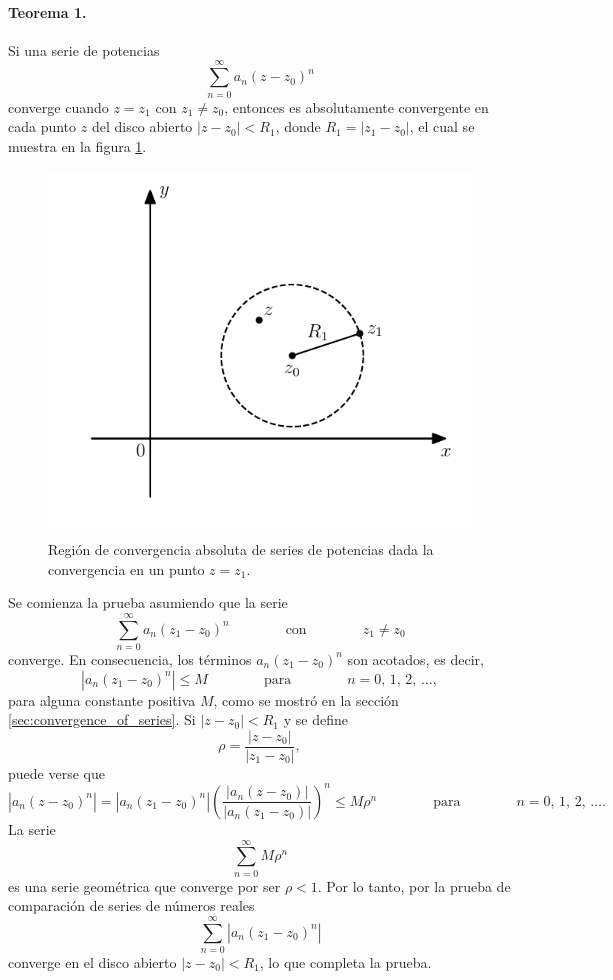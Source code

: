 \documentclass[a4paper]{report}
\begin{document}
\paragraph{Teorema 1.} Si una serie de potencias
\begin{equation}\label{eq:power_series_generic_definition_tmp1}
 \sum_{n=0}^\infty a_n(z-z_0)^n 
\end{equation}
converge cuando \(z=z_1\) con \(z_1\neq z_0\), entonces es absolutamente convergente en cada punto \(z\) del disco abierto \(|z-z_0|<R_1\), donde \(R_1=|z_1-z_0|\), el cual se muestra en la figura \ref{fig:series_absolute_convergence}.
\begin{figure}[!htb]
  \begin{minipage}[c]{0.5\textwidth}
    \includegraphics[width=\textwidth]{figuras/series_absolute_convergence.pdf}
  \end{minipage}\hfill
  \begin{minipage}[c]{0.4\textwidth}
    \caption{
        Región de convergencia absoluta de series de potencias dada la convergencia en un punto \(z=z_1\).
    }\label{fig:series_absolute_convergence}
  \end{minipage}
\end{figure}
 
Se comienza la prueba asumiendo que la serie 
\[
 \sum_{n=0}^\infty a_n(z_1-z_0)^n
 \qquad\qquad\textrm{con}\qquad\qquad
 z_1\neq z_0
\]
converge. En consecuencia, los términos \(a_n(z_1-z_0)^n\) son acotados, es decir,
\[
 |a_n(z_1-z_0)^n|\leq M
 \qquad\qquad\textrm{para}\qquad\qquad
 n=0,\,1,\,2,\,\dots,
\]
para alguna constante positiva \(M\), como se mostró en la sección \ref{sec:convergence_of_series}. Si \(|z-z_0|<R_1\) y se define 
\[
 \rho=\frac{|z-z_0|}{|z_1-z_0|},
\]
puede verse que 
\[
 |a_n(z-z_0)^n|=|a_n(z_1-z_0)^n|\left(\frac{|a_n(z-z_0)|}{|a_n(z_1-z_0)|}\right)^n\leq M\rho^n
 \qquad\qquad\textrm{para}\qquad\qquad
 n=0,\,1,\,2,\,\dots.
\]
La serie
\[
 \sum_{n=0}^\infty M\rho^n
\]
es una serie geométrica que converge por ser \(\rho<1\). Por lo tanto, por la prueba de comparación de series de números reales 
\[
 \sum_{n=0}^\infty|a_n(z_1-z_0)^n|
\]
converge en el disco abierto \(|z-z_0|<R_1\), lo que completa la prueba. 
 
\end{document}
